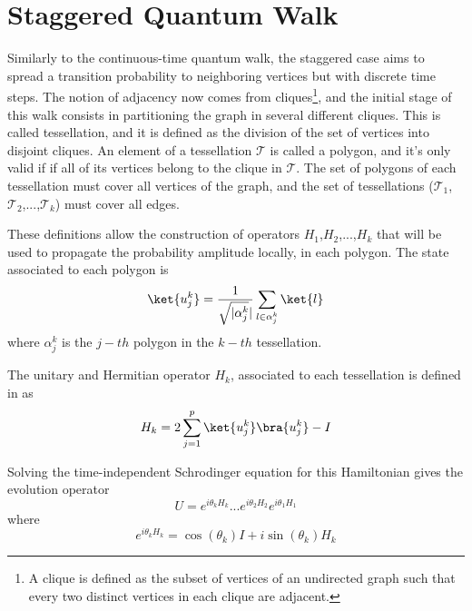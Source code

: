             \section{Staggered Quantum Walk}\label{stagWalk}
            	Similarly to the continuous-time quantum walk, the staggered case aims to spread a transition probability to neighboring vertices but with discrete time steps. The notion of adjacency now comes from cliques\footnote{A clique is defined as the subset of vertices of an undirected graph such that every two distinct vertices in each clique are adjacent.}, and the initial stage of this walk consists in partitioning the graph in several different cliques. This is called tessellation, and it is defined as the division of the set of vertices into disjoint cliques. An element of a tessellation $\mathscr{T}$ is called a polygon, and it's only valid if if all of its vertices belong to the clique in $\mathscr{T}$. The set of polygons of each tessellation must cover all vertices of the graph, and the set of tessellations ($\mathscr{T}_{1}$,$\mathscr{T}_{2}$,...,$\mathscr{T}_{k}$) must cover all edges.\par
            	These definitions allow the construction of operators $H_1$,$H_2$,...,$H_k$ that will be used to propagate the probability amplitude locally, in each polygon. The state associated to each polygon is
            	\begin{equation}
            	    \ket{u_{j}^{k}} = \frac{1}{\sqrt{\mathopen|\alpha_{j}^{k}}\mathclose|}\sum_{l\in\alpha_{j}^{k}}\ket{l}
            	\end{equation}
            	where $\alpha_{j}^{k}$ is the $j-th$ polygon in the $k-th$ tessellation.\par
            	The unitary and Hermitian operator $H_k$, associated to each tessellation is defined in \cite{portugal2017b} as
            	\begin{equation}
            	    H_k = 2\sum_{j=1}^{p}\ket{u_{j}^{k}}\bra{u_{j}^{k}} - I
            	    \label{eq:StagHamil}
            	\end{equation}\par
            	Solving the time-independent Schrodinger equation for this Hamiltonian gives the evolution operator
            	\begin{equation}
            	    U = e^{i\theta_{k}H_{k}}...e^{i\theta_{2}H_{2}}e^{i\theta_{1}H_{1}}
            	    \label{eq:stagWalkUnmodOp}
            	\end{equation}
            	where
            	\begin{equation}
            	    e^{i\theta_{k}H_{k}} = \cos{(\theta_k)}I + i\sin{(\theta_k)}H_k
            	\end{equation}

